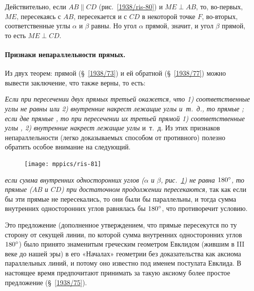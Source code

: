 \documentclass[oneside]{book}
\begin{document}
Действительно, если $AB\parallel CD$ (рис.~\ref{1938/ris-80}) и $ME\perp AB$, то, во-первых, $ME$, пересекаясь с $AB$, пересекается и с $CD$ в некоторой точке $F$, во-вторых, соответственные углы $\alpha$ и $\beta$ равны.
Но угол $\alpha$ прямой, значит, и угол $\beta$ прямой, то есть
$ME\perp CD$.

\paragraph{Признаки непараллельности прямых.}\label{1938/78}
Из двух теорем:
прямой (§~\ref{1938/73}) и ей обратной (§~\ref{1938/77}) можно вывести заключение, что  также верны, то есть:

\emph{Если при пересечении двух прямых третьей окажется, что 1) соответственные углы не равны или 2) внутренние накрест лежащие углы  и~т.~д., то прямые ;
если две прямые , то при пересечении их третьей прямой 1) соответственные углы , 2) внутренние накрест лежащие углы } и~т.~д.
Из этих признаков непараллельности (легко доказываемых способом от противного) полезно обратить особое внимание на следующий.

\begin{figure}
\centering
\texttt{[image: mppics/ris-81]}
\caption{}\label{1938/ris-81}
\end{figure}

\emph{если сумма внутренних односторонних углов \emph{($\alpha$ и $\beta$, рис.~\ref{1938/ris-81})} не равна $180\degree$, то прямые \emph{($AB$ и $CD$)} при достаточном продолжении пересекаются,} так как если бы эти прямые не пересекались, то они были бы параллельны, и тогда сумма внутренних односторонних углов равнялась бы $180\degree$, что противоречит условию.

Это предложение (дополненное утверждением, что прямые пересекутся по ту сторону от секущей линии, по которой сумма внутренних односторонних углов  $180\degree$) было принято знаменитым греческим геометром Евклидом (жившим в III веке до нашей эры) в его «Началах» геометрии без доказательства как аксиома параллельных линий, и потому оно известно под именем постулата Евклида.
В настоящее время предпочитают принимать за такую аксиому более простое предложение (§~\ref{1938/75}).
\end{document}
